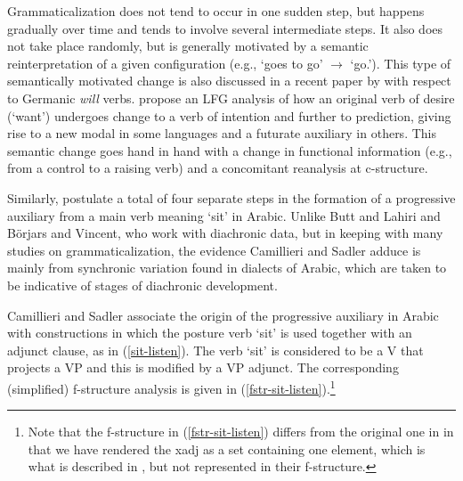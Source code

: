 \documentclass[output=paper,hidelinks]{langscibook}
\begin{document}


Grammaticalization does not tend to occur in one sudden step, but happens gradually over time and tends to involve several intermediate steps.  It also does not take place randomly, but is generally motivated by a semantic reinterpretation of a given configuration (e.g., `goes to go' $\longrightarrow$ `go.\FUT').  This type of semantically motivated change is also discussed in a recent paper by \citet{BorjarsVincent2019}  with respect to Germanic \textit{will} verbs.   \citet{BorjarsVincent2019} propose an LFG analysis of how
an original verb of desire (`want') undergoes change to a verb of intention and further to prediction, giving rise to a new modal in some languages and a futurate auxiliary in others.  This semantic change goes hand in hand with a change in functional information (e.g., from a control to a raising verb) and a concomitant reanalysis at c-structure. 

Similarly, \citet{CamilleriSadler:LFG2018,camilleri2020grammaticalisation} postulate a total of four separate steps in the formation of a progressive auxiliary from a main verb meaning `sit' in Arabic.  Unlike Butt and Lahiri and B\"{o}rjars and Vincent, who work with diachronic data, but in keeping with many studies on grammaticalization, the evidence Camillieri and Sadler  adduce is mainly from synchronic variation found in dialects of Arabic, which are taken to be indicative of stages of diachronic development. 

Camillieri and Sadler associate the origin of the progressive auxiliary in Arabic with constructions in which the posture verb `sit' is used together with an adjunct clause, as in (\ref{sit-listen}).  The verb `sit' is considered to be a V that projects a VP and this is modified by a VP adjunct. The corresponding (simplified) f-structure analysis is given in (\ref{fstr-sit-listen}).\footnote{Note that the f-structure in  (\ref{fstr-sit-listen}) differs from the original one in \citet[26]{camilleri2020grammaticalisation} in that we have rendered the {\sc xadj} as a set containing one element,  which is what is described in \citet[26]{camilleri2020grammaticalisation}, but not represented in their f-structure.}
\end{document}
